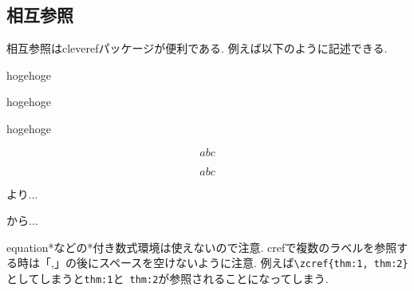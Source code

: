 \documentclass[11pt,a4paper,oneside,lualatex]{ltjsarticle} %
\numberwithin{equation}{section} %
\begin{document}

\subsection{相互参照} \label{subsec:ref}


相互参照はcleverefパッケージが便利である. 
例えば以下のように記述できる.

\begin{thm} \label{thm:2}
	hogehoge
\end{thm}

\begin{thm} \label{thm:3}
	hogehoge
\end{thm}

\begin{lem} \label{lem:1}
	hogehoge
\end{lem}

\begin{equation} \label{eq:1}
	abc
\end{equation}

\begin{equation} \label{eq:2}
	abc
\end{equation}

より... 

から...

equation*などの*付き数式環境は使えないので注意.
crefで複数のラベルを参照する時は「,」の後にスペースを空けないように注意.
例えば\verb*|\zcref{thm:1, thm:2}|としてしまうと\verb|thm:1|と\verb*| thm:2|が参照されることになってしまう. 


%
%
%
\end{document}
